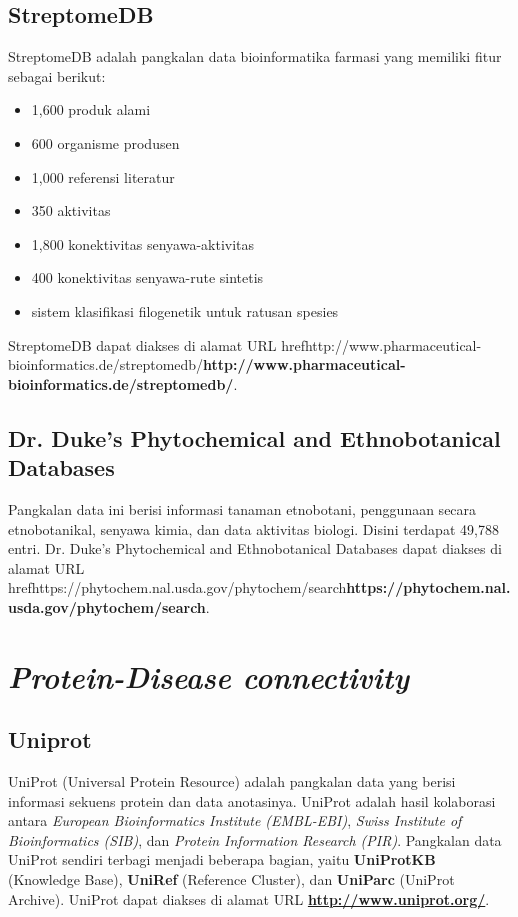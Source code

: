 	\subsection{StreptomeDB} \label{streptome_db}
	StreptomeDB adalah pangkalan data bioinformatika farmasi yang memiliki fitur sebagai berikut:
	\begin{itemize}
	\item 1,600 produk alami
	\item 600 organisme produsen
	\item 1,000 referensi literatur
	\item 350 aktivitas
	\item 1,800 konektivitas senyawa-aktivitas
	\item 400 konektivitas senyawa-rute sintetis 
	\item sistem klasifikasi filogenetik untuk ratusan spesies
	\end{itemize}
	StreptomeDB dapat diakses di alamat URL href{http://www.pharmaceutical-bioinformatics.de/streptomedb/}{\textbf{http://www.pharmaceutical-bioinformatics.de/streptomedb/}}.

	\subsection{Dr. Duke's Phytochemical and Ethnobotanical Databases} \label{pedb}
	Pangkalan data ini berisi informasi tanaman etnobotani, penggunaan secara etnobotanikal, senyawa kimia, dan data aktivitas biologi. Disini terdapat 49,788 entri. Dr. Duke's Phytochemical and Ethnobotanical Databases dapat diakses di alamat URL href{https://phytochem.nal.usda.gov/phytochem/search}{\textbf{https://phytochem.nal.usda.gov/phytochem/search}}.

\section{\emph{Protein-Disease connectivity}}
	\subsection{Uniprot} \label{uniprot}
	UniProt (Universal Protein Resource) adalah pangkalan data yang berisi informasi sekuens protein dan data anotasinya. UniProt adalah hasil kolaborasi antara \emph{European Bioinformatics Institute (EMBL-EBI)}, \emph{Swiss Institute of Bioinformatics (SIB)}, dan \emph{Protein Information Research (PIR)}. Pangkalan data UniProt sendiri terbagi menjadi beberapa bagian, yaitu \textbf{UniProtKB} (Knowledge Base), \textbf{UniRef} (Reference Cluster), dan \textbf{UniParc} (UniProt Archive). UniProt dapat diakses di alamat URL \href{http://www.uniprot.org/}{\textbf{http://www.uniprot.org/}}.

